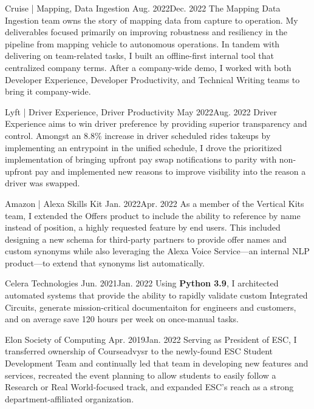 \documentclass{listofpersonalprofessionalachievements}
\begin{document}
\begin{itemize}
{Cruise | Mapping, Data Ingestion}
{Aug. 2022}{Dec. 2022}
{The Mapping Data Ingestion team owns the story of mapping data from capture to operation. My deliverables focused primarily on improving robustness and resiliency in the pipeline from mapping vehicle to autonomous operations. In tandem with delivering on team-related tasks, I built an offline-first internal tool that centralized company terms. After a company-wide demo, I worked with both Developer Experience, Developer Productivity, and Technical Writing teams to bring it company-wide.}

{Lyft | Driver Experience, Driver Productivity}
{May 2022}{Aug. 2022}
{Driver Experience aims to win driver preference by providing superior transparency and control. Amongst an 8.8\% increase in driver scheduled rides takeups by implementing an entrypoint in the unified schedule, I drove the prioritized implementation of bringing upfront pay swap notifications to parity with non-upfront pay and implemented new reasons to improve visibility into the reason a driver was swapped.}

{Amazon | Alexa Skills Kit}
{Jan. 2022}{Apr. 2022}
{As a member of the Vertical Kits team, I extended the Offers product to include the ability to reference by name instead of position, a highly requested feature by end users. This included designing a new schema for third-party partners to provide offer names and custom synonyms while also leveraging the Alexa Voice Service—an internal NLP product—to extend that synonyms list automatically.}

{Celera Technologies}
{Jun. 2021}{Jan. 2022}
{Using \textbf{Python 3.9}, I architected automated systems that provide the ability to rapidly validate custom Integrated Circuits, generate mission-critical documentaiton for engineers and customers, and on average save 120 hours per week on once-manual tasks.}
\end{itemize}

\begin{itemize}
{Elon Society of Computing}
{Apr. 2019}{Jan. 2022}
{Serving as President of ESC, I transferred ownership of Courseadvysr to the newly-found ESC Student Development Team and continually led that team in developing new features and services, recreated the event planning to allow students to easily follow a Research or Real World-focused track, and expanded ESC’s reach as a strong department-affiliated organization.}
\end{itemize}
\end{document}
